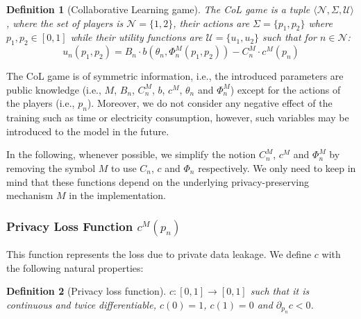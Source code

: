 \documentclass[USenglish,oneside,twocolumn]{article}
\theoremstyle{plain}
\newtheorem{definition}{Definition}
\begin{document}
    \vspace{-0.25cm}
    \begin{definition}[Collaborative Learning game]
        The CoL game is a tuple $\langle\mathcal{N},\Sigma,\mathcal{U}\rangle$, where the set of players is $\mathcal{N}=\{1,2\}$, their actions are $\Sigma=\{p_1,p_2\}$ where $p_1,p_2\in[0,1]$ while their utility functions are $\mathcal{U}=\{u_1,u_2\}$ such that for $n\in\mathcal{N}$:
        \vspace{-0.1cm}
        \begin{equation}
        \label{eq:ut}
        u_n(p_1,p_2)=B_n\cdot b(\theta_n,\Phi_n^M(p_1,p_2))-C_n^M\cdot c^M(p_n)
        \end{equation}
    \end{definition}
    \vspace{-0.25cm}
    
    The CoL game is of symmetric information, i.e.,  the introduced parameters are public knowledge (i.e., $M$, $B_n$, $C_n^M$, $b$, $c^M$, $\theta_n$ and $\Phi_n^M$) except for the actions of the players (i.e., $p_n$). Moreover, we do not consider any negative effect of the training such as time or electricity consumption, however, such variables may be introduced to the model in the future. 
    
    In the following, whenever possible, we simplify the notion $C_n^M$, $c^M$ and $\Phi_n^M$ by removing the symbol $M$ to use $C_n$, $c$ and $\Phi_n$ respectively. We only need to keep in mind that these functions depend on the underlying privacy-preserving mechanism $M$ in the implementation. 
    
    \vspace{-0.5cm}
    \subsubsection{Privacy Loss Function $c^M(p_n)$}
    \label{sec:pri}
    \vspace{-0.25cm}
    
    This function represents the loss due to private data leakage. We define $c$ with the following natural properties:
    
    \vspace{-0.25cm}
    \begin{definition}[Privacy loss function]
        \label{def:c}
        $c:[0,1]\rightarrow[0,1]$ such that it is continuous and twice differentiable, $c(0)=1$, $c(1)=0$ and $\partial_{p_n}c<0$.
    \end{definition}
    \vspace{-0.25cm}
    
\end{document}
